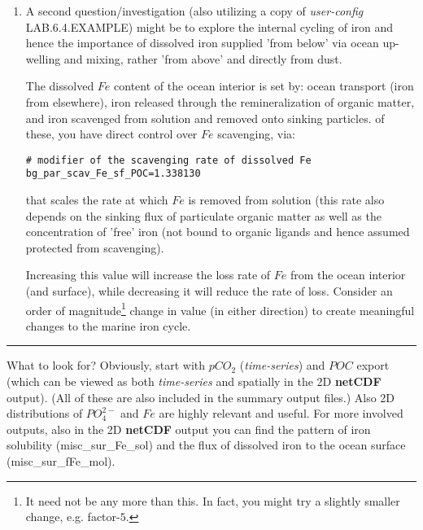 \begin{enumerate}[noitemsep]
\newpage

\vspace{1mm}
\item A second question/investigation (also utilizing a copy of \textit{user-config} \textsf{\footnotesize LAB.6.4.EXAMPLE}) might be to explore the internal cycling of iron and hence the importance of dissolved iron supplied 'from below' via ocean up-welling and mixing, rather 'from above' and directly from dust.

\vspace{1mm}
The dissolved \(Fe\) content of the ocean interior is set by: ocean transport (iron from elsewhere), iron released through the remineralization of organic matter, and iron scavenged from solution and removed onto sinking particles. of these, you have direct control over \(Fe\) scavenging, via:
\vspace{-1mm}\small\begin{verbatim}
# modifier of the scavenging rate of dissolved Fe
bg_par_scav_Fe_sf_POC=1.338130
\end{verbatim}\normalsize\vspace{-1mm}
that scales the rate at which \(Fe\) is removed from solution (this rate also depends on the sinking flux of particulate organic matter as well as the concentration of 'free' iron (not bound to organic ligands and hence assumed protected from scavenging).

\vspace{1mm}
Increasing this value will increase the loss rate of \(Fe\) from the ocean interior (and surface), while decreasing it will reduce the rate of loss. Consider an order of magnitude\footnote{It need not be any more than this. In fact, you might try a slightly smaller change, e.g. factor-\(5\).} change in value (in either direction) to create meaningful changes to the marine iron cycle.

\end{enumerate}

\vspace{1mm} \noindent\rule{4cm}{0.1mm} \vspace{2mm}

\noindent What to look for? Obviously, start with \(pCO_{2}\) (\textit{time-series}) and \(POC\) export (which can be viewed as both \textit{time-series} and spatially in the 2D \textbf{netCDF} output). (All of these are also included in the summary output files.) Also 2D distributions of \(PO^{2-}_{4}\) and \(Fe\) are highly relevant and useful. For more involved outputs, also in the  2D \textbf{netCDF} output you can find the pattern of iron solubility (\textsf{\footnotesize misc\_sur\_Fe\_sol}) and the flux of dissolved iron to the ocean surface (\textsf{\footnotesize misc\_sur\_fFe\_mol}). 

